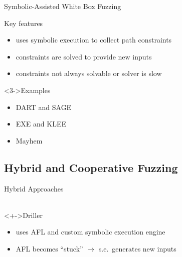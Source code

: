 \documentclass[\HandoutMode,table]{beamer}
\begin{document}
\begin{frame}{Symbolic-Assisted White Box Fuzzing}
    \begin{block}{Key features}
        \begin{itemize}
            \item{} uses symbolic execution to collect path constraints
            \item{} constraints are solved to provide new inputs
            \item<alert@2-> constraints not always solvable or solver is slow
        \end{itemize}
    \end{block}
    \begin{exampleblock}<3->{Examples}
        \begin{itemize}
            \item{} DART and SAGE
            \item{} EXE and KLEE
            \item{} Mayhem
        \end{itemize}
    \end{exampleblock}
\end{frame}

\subsection{Hybrid and Cooperative Fuzzing}

\begin{frame}{Hybrid Approaches}
    \\~\\
    \begin{exampleblock}<+->{Driller}
        \begin{itemize}
            \item{} uses AFL and custom symbolic execution engine
            \item{} AFL becomes ``stuck'' $\rightarrow$ s.e.\ generates new inputs
        \end{itemize}
    \end{exampleblock}
\end{frame}
\end{document}
